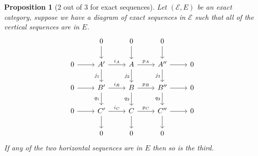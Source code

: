 \documentclass[12pt]{report}
\numberwithin{equation}{section}
\newtheorem{proposition}[dummy]{Proposition}
\begin{document}
		\begin{proposition}[\(2\) out of \(3\) for exact sequences]\label{2-3exactsequences}
			Let \((\mathcal{E},E)\) be an exact category, suppose we have a diagram of exact sequences in \(\mathcal{E}\) such that all of the vertical sequences are in \(E\).
			\[\begin{tikzcd}
				& 0 & 0 & 0 \\
				0 & {A'} & A & {A''} & 0 \\
				0 & {B'} & B & {B''} & 0 \\
				0 & {C'} & C & {C''} & 0 \\
				& 0 & 0 & 0
				\arrow[from=1-2, to=2-2]
				\arrow[from=1-3, to=2-3]
				\arrow[from=1-4, to=2-4]
				\arrow[from=2-1, to=2-2]
				\arrow["{i_A}", from=2-2, to=2-3]
				\arrow["{j_1}"', from=2-2, to=3-2]
				\arrow["{p_A}", from=2-3, to=2-4]
				\arrow["{j_2}"', from=2-3, to=3-3]
				\arrow[from=2-4, to=2-5]
				\arrow["{j_3}"', from=2-4, to=3-4]
				\arrow[from=3-1, to=3-2]
				\arrow["{i_B}", from=3-2, to=3-3]
				\arrow["{q_1}"', from=3-2, to=4-2]
				\arrow["{p_B}", from=3-3, to=3-4]
				\arrow["{q_2}"', from=3-3, to=4-3]
				\arrow[from=3-4, to=3-5]
				\arrow["{q_3}"', from=3-4, to=4-4]
				\arrow[from=4-1, to=4-2]
				\arrow["{i_C}", from=4-2, to=4-3]
				\arrow[from=4-2, to=5-2]
				\arrow["{p_C}", from=4-3, to=4-4]
				\arrow[from=4-3, to=5-3]
				\arrow[from=4-4, to=4-5]
				\arrow[from=4-4, to=5-4]
			\end{tikzcd}\]
			If any of the two horizontal sequences are in \(E\) then so is the third.
			
		\end{proposition}
\end{document}
